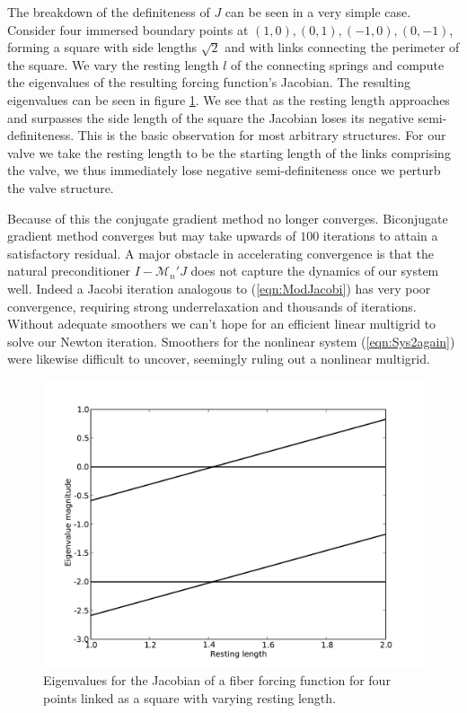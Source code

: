 \documentclass[preprint,12pt]{elsarticle}
\begin{document}
The breakdown of the definiteness of $J$ can be seen in a very simple case. Consider four immersed boundary points at $(1,0),(0,1),(-1,0),(0,-1)$, forming a square with side lengths $\sqrt{2}$ and with links connecting the perimeter of the square. We vary the resting length $l$ of the connecting springs and compute the eigenvalues of the resulting forcing function's Jacobian. The resulting eigenvalues can be seen in figure \ref{fig:BoxEigenvalues}. We see that as the resting length approaches and surpasses the side length of the square the Jacobian loses its negative semi-definiteness. This is the basic observation for most arbitrary structures. For our valve we take the resting length to be the starting length of the links comprising the valve, we thus immediately lose negative semi-definiteness once we perturb the valve structure.

Because of this the conjugate gradient method no longer converges. Biconjugate gradient method converges but may take upwards of $100$ iterations to attain a satisfactory residual. A major obstacle in accelerating convergence is that the natural preconditioner $I-\mathcal{M}_n'J$ does not capture the dynamics of our system well. Indeed a Jacobi iteration analogous to (\ref{eqn:ModJacobi}) has very poor convergence, requiring strong underrelaxation and thousands of iterations. Without adequate smoothers we can't hope for an efficient linear multigrid to solve our Newton iteration. Smoothers for the nonlinear system (\ref{eqn:Sys2again}) were likewise difficult to uncover, seemingly ruling out a nonlinear multigrid.

\begin{figure}[!b]
  \begin{center}
    \includegraphics[bb=.15in .15in 8in 6in,width=5.25in,clip]{BoxEigenvalues.pdf}
  \end{center}

  \caption{\small Eigenvalues for the Jacobian of a fiber forcing function for four points linked as a square with varying resting length.}
  \label{fig:BoxEigenvalues}
\end{figure}
\end{document}
